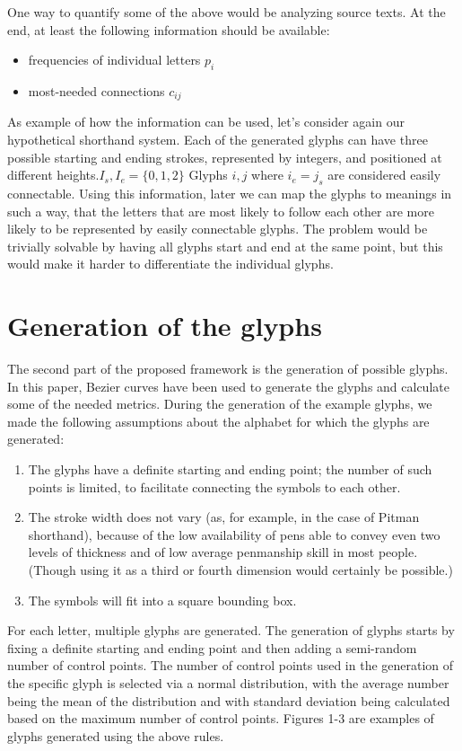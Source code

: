 \documentclass[conference]{IEEEtran}
\begin{document}
One way to quantify some of the above would be analyzing source texts. At the end, at least the following information should be available:
\begin{itemize}
        \item frequencies of individual letters \(p_i\)
        \item most-needed connections \(c_{ij}\)
\end{itemize}

As example of how the information can be used, let's consider again our hypothetical shorthand system. Each of the generated glyphs can have three possible starting and ending strokes, represented by integers, and positioned at different heights.\(I_s, I_e=\{0, 1, 2\}\) Glyphs \(i, j\) where \(i_e=j_s\) are considered easily connectable. Using this information, later we can map the glyphs to meanings in such a way, that the letters that are most likely to follow each other are more likely to be
represented by easily connectable glyphs. The problem would be trivially solvable by having all glyphs start and end at the same point, but this would make it harder to differentiate the individual glyphs.

\section{Generation of the glyphs}
The second part of the proposed framework is the generation of possible glyphs. In this paper, Bezier curves have been used to generate the glyphs and calculate some of the needed metrics.
During the generation of the example glyphs, we made the following assumptions about the alphabet for which the glyphs are generated:
\begin{enumerate}
        \item The glyphs have a definite starting and ending point; the number of such points is limited, to facilitate connecting the symbols to each other.
        \item The stroke width does not vary (as, for example, in the case of Pitman shorthand), because of the low availability of pens able to convey even two levels of thickness and of low average penmanship skill in most people. (Though using it as a third or fourth dimension would certainly be possible.)
        \item The symbols will fit into a square bounding box.
\end{enumerate}
For each letter, multiple glyphs are generated. The generation of glyphs starts by fixing a definite starting and ending point and then adding a semi-random number of control points. The number of control points used in the generation of the specific glyph is selected via a normal distribution, with the average number being the mean of the distribution and with standard deviation being calculated based on the maximum number of control points. Figures 1-3 are examples of glyphs generated using the above rules.
\end{document}
